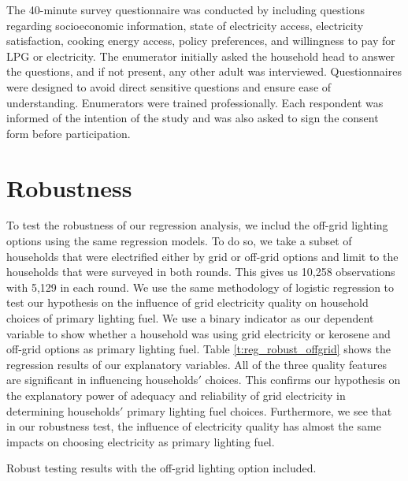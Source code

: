 \documentclass[11pt]{article}
\begin{document}
The 40-minute survey questionnaire was conducted by including questions regarding socioeconomic information, state of electricity access, electricity satisfaction, cooking energy access, policy preferences, and willingness to pay for LPG or electricity. The enumerator initially asked the household head to answer the questions, and if not present, any other adult was interviewed. Questionnaires were designed to avoid direct sensitive questions and ensure ease of understanding. Enumerators were trained professionally. Each respondent was informed of the intention of the study and was also asked to sign the consent form before participation.

\label{sect:data}



\clearpage

\section{Robustness}
\label{sect:robustness}


To test the robustness of our regression analysis, we includ the off-grid lighting options using the same regression models. To do so, we take a subset of households that were electrified either by grid or off-grid options and limit to the households that were surveyed in both rounds. This gives us 10,258 observations with 5,129 in each round. We use the same methodology of logistic regression to test our hypothesis on the influence of grid electricity quality on household choices of primary lighting fuel. We use a binary indicator as our dependent variable to show whether a household was using grid electricity or kerosene and off-grid options as primary lighting fuel. Table \ref{t:reg_robust_offgrid} shows the regression results of our explanatory variables. All of the three quality features are significant in influencing households$'$ choices. This confirms our hypothesis on the explanatory power of adequacy and reliability of grid electricity in determining households$'$ primary lighting fuel choices. Furthermore, we see that in our robustness test, the influence of electricity quality has almost the same impacts on choosing electricity as primary lighting fuel. 

\begin{table}
\centering
\renewcommand{\arraystretch}{1.5}
\resizebox{\columnwidth}{!}{%

%
}
\caption{Robust testing results with the off-grid lighting option included.}
\label{t:reg_robust_offgrid}
\end{table}
 
\end{document}
